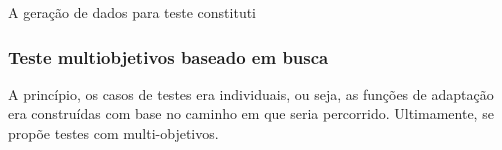A geração de dados para teste constituti 

\subsubsection{Teste multiobjetivos baseado em busca}

A princípio, os casos de testes era individuais, ou seja, as funções de adaptação era construídas com base no caminho em que seria percorrido. Ultimamente, se propõe testes com multi-objetivos. 









